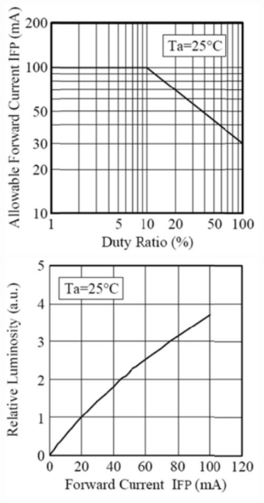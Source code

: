 \begin{figure}[htbp] \centering
\begin{minipage}[b]{0.48\textwidth} \centering
\includegraphics[width=1.00\textwidth]{billeder/Hardware/LEDDCforhold.JPG} %
\end{minipage} \hfill
\begin{minipage}[b]{0.48\textwidth} \centering
\includegraphics[width=1.00\textwidth]{billeder/Hardware/LEDlyscforhold.JPG} %

\end{minipage}
\end{figure}
